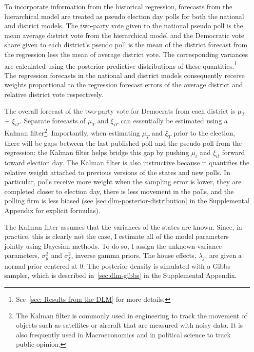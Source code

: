 \documentclass[12pt,final,fleqn]{article}
\theoremstyle{plain}
\begin{document}
To incorporate information from the historical regression, forecasts from the hierarchical model are treated as pseudo election day polls for both the national and district models. The two-party vote given to the national pseudo poll is the mean average district vote from the hierarchical model and the Democratic vote share given to each district's pseudo poll is the mean of the district forecast from the regression less the mean of average district vote. The corresponding variances are calculated using the posterior predictive distributions of these quantities.\footnote{See~\autoref{sec: Results from the DLM} for more details.} The regression forecasts in the national and district models consequently receive weights proportional to the regression forecast errors of the average district and relative district vote respectively. 

The overall forecast of the two-party vote for Democrats from each district is $\mu_T$ + $\xi_{iT}$. Separate forecasts of $\mu_T$ and $\xi_{iT}$ can essentially be estimated using a Kalman filter\footnote{The Kalman filter is commonly used in engineering to track the movement of objects such as satellites or aircraft that are measured with noisy data. It is also frequently used in Macroeconomics and in political science to track public opinion.}. Importantly, when estimating $\mu_T$ and $\xi_T$ prior to the election, there will be gaps between the last published poll and the pseudo poll from the regression; the Kalman filter helps bridge this gap by pushing $\mu_t$ and $\xi_{it}$ forward toward election day. The Kalman filter is also instructive because it quantifies the relative weight attached to previous versions of the states and new polls. In particular, polls receive more weight when the sampling error is lower, they are completed closer to election day, there is less movement in the polls, and the polling firm is less biased (see \autoref*{sec:dlm-posterior-distribution} in the Supplemental Appendix for explicit formulas).

The Kalman filter assumes that the variances of the states are known. Since, in practice, this is clearly not the case, I estimate all of the model parameters jointly using Bayesian methods. To do so, I assign the unknown variance parameters, $\sigma_\mu^2$ and $\sigma_\xi^2$, inverse gamma priors. The house effects, $\lambda_j$, are given a normal prior centered at $0$. The posterior density is simulated with a Gibbs sampler, which is described in~\autoref*{sec:dlm-gibbs} in the Supplemental Appendix.
\end{document}
